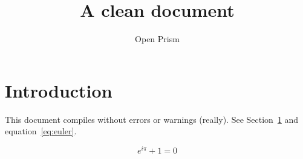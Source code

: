 \documentclass{article}
\title{A clean document}
\author{Open Prism}
\date{}
\begin{document}
\maketitle

\section{Introduction}\label{sec:intro}
This document compiles without errors or warnings (really).
See Section~\ref{sec:intro} and equation~\eqref{eq:euler}.

\begin{equation}
  e^{i\pi} + 1 = 0 \label{eq:euler}
\end{equation}
\end{document}
